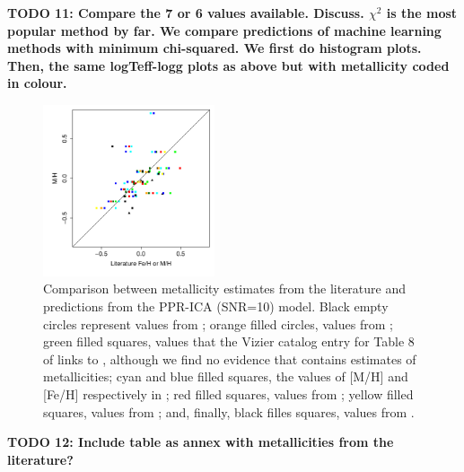{\bf TODO 11: Compare the 7 or 6 values available. Discuss.  $\chi^2$
  is the most popular method by far. We compare predictions of machine
  learning methods with minimum chi-squared. We first do histogram
  plots. Then, the same logTeff-logg plots as above but with
  metallicity coded in colour.}

 \begin{figure}
 \centering
 \includegraphics[width=0.45\textwidth]{figs/irtf-figs/M-ICA10.pdf}

\caption{Comparison
  between metallicity estimates from the literature and predictions
  from the PPR-ICA (SNR=10) model.  Black empty circles represent
  values from \cite{cesetti} ; orange filled circles, values
  from \cite{NevesIII}; green filled squares, values that the Vizier
  catalog entry for Table 8 of \cite{NevesIII} links to \cite{Jao},
  although we find no evidence that \cite{Jao} contains estimates of
  metallicities; cyan and blue filled squares, the values of [M/H] and
  [Fe/H] respectively in \cite{RA2012}; red filled squares, values
  from \cite{Mann2015}; yellow filled squares, values
  from \cite{Newton2014}; and, finally, black filles squares, values
  from \cite{Gaidos2015}.}

\label{MIRTF_ICA_10}
\end {figure}

 {\bf TODO 12: Include table as annex with metallicities from the
 literature?}
